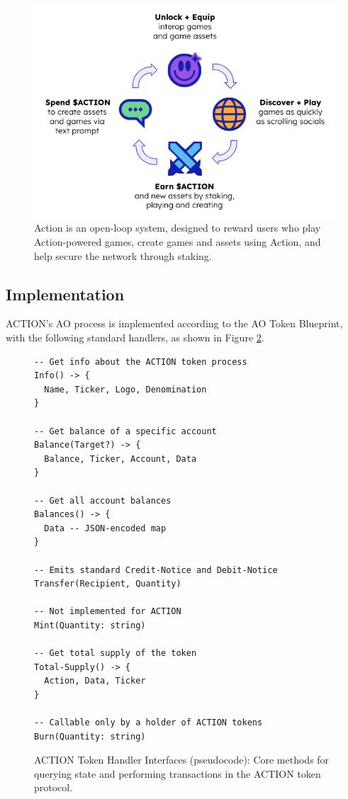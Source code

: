 \begin{figure}[ht]
  \centering
  \includegraphics[width=\columnwidth]{images/image8.png}
  \caption{Action is an open-loop system, designed to reward users who play Action-powered games, create games and assets using Action, and help secure the network through staking.}
  \label{fig:economic_model}
\end{figure}
  

\subsection{Implementation}

ACTION's AO process is implemented according to the AO Token Blueprint, with the following standard handlers, as shown in Figure \ref{fig:action_token_interface}.

\begin{figure}[t]
\begin{lstlisting}[basicstyle=\ttfamily\small]
-- Get info about the ACTION token process
Info() -> {
  Name, Ticker, Logo, Denomination
}

-- Get balance of a specific account
Balance(Target?) -> {
  Balance, Ticker, Account, Data
}

-- Get all account balances
Balances() -> {
  Data -- JSON-encoded map
}

-- Emits standard Credit-Notice and Debit-Notice
Transfer(Recipient, Quantity)

-- Not implemented for ACTION
Mint(Quantity: string)

-- Get total supply of the token
Total-Supply() -> {
  Action, Data, Ticker
}

-- Callable only by a holder of ACTION tokens
Burn(Quantity: string)
\end{lstlisting}
\caption{ACTION Token Handler Interfaces (pseudocode): Core methods for querying state and performing transactions in the ACTION token protocol.}
\label{fig:action_token_interface}
\end{figure}
